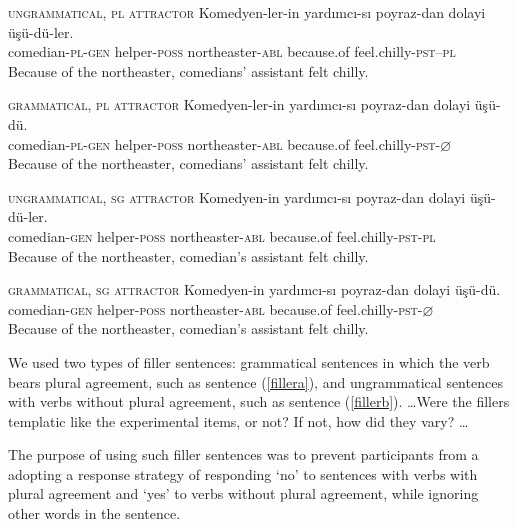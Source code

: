 \documentclass[doc]{apa6}
\begin{document}
\begin{exe}
\ex \label{exp1_item}
  \begin{xlist}

  \ex \textsc{ungrammatical, pl attractor} \label{exp1_a}
      \gll Komedyen-ler-in yardımcı-sı poyraz-dan dolayi ü\c{s}ü-dü-ler.\\
  comedian-\textsc{pl}-\textsc{gen} helper-\textsc{poss} northeaster-\textsc{abl} because.of feel.chilly-\textsc{pst}--\textsc{pl}\\
      \glt Because of the northeaster, comedians' assistant felt chilly.

  \ex \textsc{grammatical, pl attractor} \label{exp1_b}
      \gll Komedyen-ler-in yardımcı-sı poyraz-dan dolayi ü\c{s}ü-dü.\\
  comedian-\textsc{pl}-\textsc{gen} helper-\textsc{poss} northeaster-\textsc{abl} because.of feel.chilly-\textsc{pst}-$\varnothing$\\
      \glt Because of the northeaster, comedians' assistant felt chilly.

  \ex \textsc{ungrammatical, sg attractor} \label{exp1_c}
      \gll Komedyen-in yardımcı-sı poyraz-dan dolayi ü\c{s}ü-dü-ler.\\
  comedian-\textsc{gen} helper-\textsc{poss} northeaster-\textsc{abl} because.of feel.chilly-\textsc{pst}-\textsc{pl}\\
      \glt Because of the northeaster, comedian's assistant felt chilly.
  
  \ex \textsc{grammatical, sg attractor} \label{exp1_d}
      \gll Komedyen-in yardımcı-sı poyraz-dan dolayi ü\c{s}ü-dü.\\
  comedian-\textsc{gen} helper-\textsc{poss} northeaster-\textsc{abl} because.of feel.chilly-\textsc{pst}-$\varnothing$\\
      \glt Because of the northeaster, comedian's assistant felt chilly.

  \end{xlist}
\end{exe}

We used two types of filler sentences: grammatical sentences in which the verb bears plural agreement, such as sentence (\ref{fillera}), and ungrammatical sentences with verbs without plural agreement, such as sentence (\ref{fillerb}).
\ldots Were the fillers templatic like the experimental items, or not? If not, how did they vary? \ldots

The purpose of using such filler sentences was to prevent participants from a adopting a response strategy of responding `no' to sentences with verbs with plural agreement and `yes' to verbs without plural agreement, while ignoring other words in the sentence.
\end{document}
